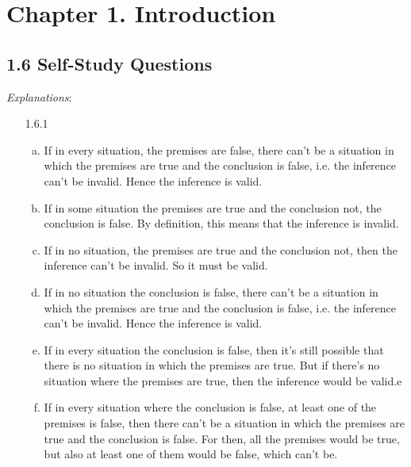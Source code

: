 \chapter{Chapter 1. Introduction}

\section*{1.6 Self-Study Questions}

\emph{Explanations}: 

	\begin{enumerate}

	\item[1.6.1] \begin{enumerate}[(a)]
	
		\item If in every situation, the premises are false, there can't be a situation in which the premises are true and the conclusion is false, i.e. the inference can't be invalid. Hence the inference is valid.
		
		\item If in some situation the premises are true and the conclusion not, the conclusion is false. By definition, this means that the inference is invalid.
		
		\item If in no situation, the premises are true and the conclusion not, then the inference can't be invalid. So it must be valid.
		
		\item If in no situation the conclusion is false, there can't be a situation in which the premises are true and the conclusion is false, i.e. the inference can't be invalid. Hence the inference is valid.
		
		\item If in every situation the conclusion is false, then it's still possible that there is no situation in which the premises are true. But if there's no situation where the premises are true, then the inference would be valid.e
		
		\item If in every situation where the conclusion is false, at least one of the premises is false, then there can't be a situation in which the premises are true and the conclusion is false. For then, all the premises would be true, but also at least one of them would be false, which can't be.
	
	\end{enumerate}
	

\end{enumerate}
